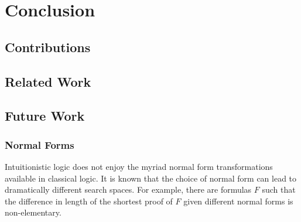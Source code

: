 
\chapter{Conclusion}\label{chapter.concl}

\section{Contributions}

\section{Related Work}

\section{Future Work}

\subsection{Normal Forms}

Intuitionistic logic does not enjoy the myriad normal form transformations
available in classical logic.  It is known that the choice of normal form
can lead to dramatically different search spaces.  For example, there are
formulas $F$ such that the difference in length of the shortest proof of $F$
given different normal forms is non-elementary.~\cite{Baaz.2001.Handbook}

